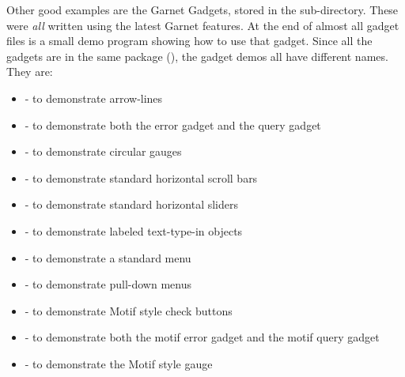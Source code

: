 Other good examples are the Garnet Gadgets, stored in the 
sub-directory.  These were {\it all} written using the latest
Garnet features.  At the end of almost all gadget files is a small demo
program showing how to use that gadget.  Since all the gadgets are
in the same package (), the gadget demos all have
different names.  They are:
\begin{itemize}
\item {} 
- to demonstrate arrow-lines

\item {} 
 
- to demonstrate both the error gadget and the query gadget

\item {}  
- to demonstrate circular gauges

\item {} 
- to demonstrate standard horizontal scroll bars

\item {} 
- to demonstrate standard horizontal sliders

\item {} 
- to demonstrate labeled text-type-in objects

\item {} 
- to demonstrate a standard menu

\item {} 
- to demonstrate pull-down menus

\item {}
- to demonstrate Motif style check buttons

\item {} 
 
- to demonstrate both the motif error gadget and the motif query gadget

\item {}
- to demonstrate the Motif style gauge


\end{itemize}
